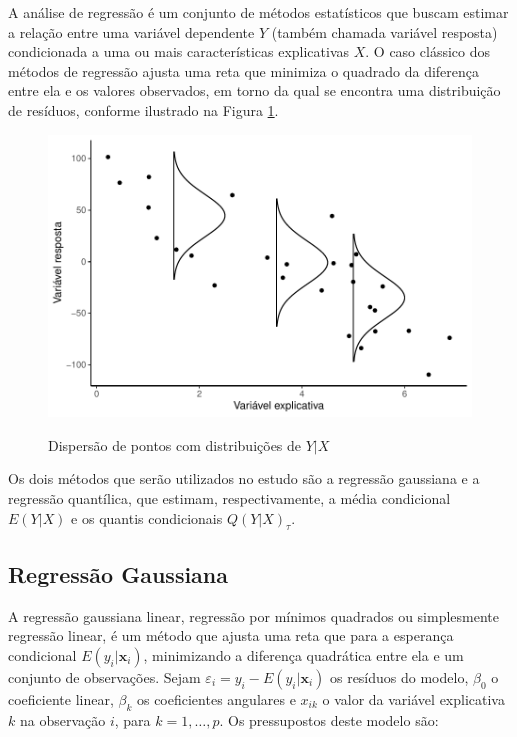 A análise de regressão é um conjunto de métodos estatísticos que buscam estimar a relação entre uma variável dependente $Y$ (também chamada variável resposta) condicionada a uma ou mais características explicativas $X$. O caso clássico dos métodos de regressão ajusta uma reta que minimiza o quadrado da diferença entre ela e os valores observados, em torno da qual se encontra uma distribuição de resíduos, conforme ilustrado na Figura \ref{fig:exemplo_regressao}.

\begin{figure}[H]
    \centering
    \caption{Dispersão de pontos com distribuições de $Y | X$}
    \includegraphics[scale=1.05]{imagens/scatter2.pdf}
    \label{fig:exemplo_regressao}
\end{figure}

 Os dois métodos que serão utilizados no estudo são a regressão gaussiana e a regressão quantílica, que estimam, respectivamente, a média condicional $E(Y|X)$ e os quantis condicionais $Q(Y|X)_\tau$.

\newpage
\subsection{Regressão Gaussiana}
A regressão gaussiana linear, regressão por mínimos quadrados ou simplesmente regressão linear, é um método que ajusta uma reta que para a esperança condicional $E(y_i|\mathbf{x}_i)$, minimizando a diferença quadrática entre ela e um conjunto de observações. Sejam $\varepsilon_i = y_i - E(y_i|\mathbf{x}_i)$ os resíduos do modelo, $\beta_0$ o coeficiente linear, $\beta_k$ os coeficientes angulares e $x_{ik}$ o valor da variável explicativa $k$ na observação $i$, para $k = 1, \dots, p$. Os pressupostos deste modelo são:

